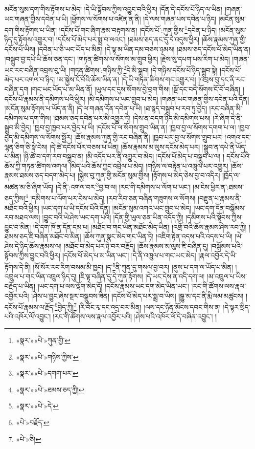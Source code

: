 མངོན་སུམ་དག་གིས་རྟོགས་པ་མེད། །དེ་ཡི་སྟོབས་ཀྱིས་འབྱུང་བའི་ཕྱིར། །དོན་དེ་དངོས་པོ་ཉིད་ལ་ཡིན། །གཞན་ཡང་གཞན་གྱིས་དབེན་པ་ཡི། །ཕྱོགས་ལ་སོགས་པ་འཛིན་ན་ནི། །དེ་ལས་གཞན་པས་དབེན་པ་ཉིད། །མངོན་སུམ་དག་གིས་རྟོགས་པ་ཡིན། །དངོས་པོ་གང་ཞིག་རྣམ་བརྟགས་ན། །དངོས་པོ་:ཀུན་གྱིས་\footnote{«སྣར་»«པེ་»ཀུན་གྱི་}དབེན་པ་ཉིད། །མངོན་སུམ་ཉིད་དུ་རྟོགས་འགྱུར་བ། །དངོས་པོ་མེད་པར་སྨྲ་བ་ལའང་། །ཐམས་ཅད་ནང་དུ་དེ་འདུས་ཕྱིར། །ཆོས་རྣམས་ཀུན་གྱི་དངོས་པོ་ཡིས། །དབེན་པ་ཅི་ཡང་ཡོད་པ་མིན། །དེ་ལྟ་མ་ཡིན་དམ་བཅས་ཉམས། །ཐམས་ཅད་དངོས་པོ་མེད་ཡིན་ན། །བསྒྲུབ་བྱ་དཔེ་ཡི་ཆོས་ཅན་དང་། །གཏན་ཚིགས་ལ་སོགས་མ་གྲུབ་ཕྱིར། །རྗེས་སུ་དཔག་པས་རིག་པ་མེད། །གཞན་ཡང་རང་བཞིན་འབྲས་བུ་ཡི། །གཏན་ཚིགས་:གཉིས་ཀྱི་\footnote{«སྣར་»«པེ་»གཉིས་ཀྱིས་}དེ་མི་སྒྲུབ། །དེ་གཉིས་དངོས་པོ་ཉིད་སྒྲུབ་སྟེ། །དངོས་པོ་མེད་པར་འགལ་བ་ཉིད། །མ་སྐྱེས་ངོ་བོའི་ཆོས་ཡིན་ན། །དེ་ཡི་གཏན་ཚིགས་གང་འགྱུར་བ། །འབྲས་བུ་དང་ནི་རང་བཞིན་དག །གང་ཡང་ཡོད་པ་མ་ཡིན་ནོ། །ཡུལ་དང་དུས་སོགས་བྱེ་བྲག་གིས། །སྔོ་དང་བདེ་སོགས་ངོ་བོ་བཞིན། །དངོས་པོ་རྣམས་ནི་དམིགས་པའི་ཕྱིར། །མི་དམིགས་པ་ཡང་གྲུབ་པ་མེད། །གཞན་ཡང་གཞན་གྱིས་དབེན་པའི་དོན། །མངོན་སུམ་རྟོགས་པ་ཡོད་ན་ནི། །དེ་ལ་གཞན་དོན་དབེན་པ་ཡི། །ཐ་སྙད་བསྒྲུབ་པ་རབ་ཏུ་བྱེད། །རང་བཞིན་མི་དམིགས་པ་དག་གིས། །ཐམས་ཅད་དབེན་པར་མི་འགྱུར་ཏེ། །དེས་ན་བདག་ཉིད་མི་དམིགས་པས། །རེ་ཞིག་དེ་ནི་སྒྲུབ་མི་བྱེད། །ཁྱབ་བྱ་ཁྱབ་པར་བྱེད་པ་ཡི། །དངོས་པོ་ལ་སོགས་གྲུབ་ཡིན་ན། །ཁྱབ་བྱ་ལ་སོགས་དགག་པ་ལ། །ཁྱབ་བྱེད་མི་དམིགས་ལ་སོགས་སྦྱོར། །ཆོས་རྣམས་ཀུན་གྱི་རང་བཞིན་ནི། །ཁྱབ་པར་བྱ་ལ་སོགས་གྲུབ་པར། །འགའ་དང་ལྷན་ཅིག་ཅི་སྟེ་ངེས། །དེ་ཚེ་དངོས་པོར་བཅས་པ་ཡིན། །ཆོས་རྣམས་མ་ལུས་དངོས་མེད་པར། །སྒྲུབ་ན་དཔེ་ནི་ཡོད་པ་མིན། །ཉི་ཚེ་བ་དག་རབ་བསྒྲུབ་ན། །མི་འདོད་པར་ནི་འགྱུར་བ་མེད། །དངོས་པོ་མེད་པ་བསྒྲུབ་པ་ལ། །
དངོས་པོའི་ཆོས་ཀྱི་གཏན་ཚིགས་འགལ། །མེད་པའི་ཆོས་ཀྱང་འབྲེལ་པ་མེད། །གཉིས་ལ་བརྟེན་པ་འཁྲུལ་པར་འགྱུར། །ཆོས་རྣམས་ཐམས་ཅད་བདག་མེད་པ། །སྐྱེས་བུ་ཀུན་གྱི་མངོན་སུམ་གྱིས། །རྟོགས་པ་མེད་ཅེས་བྱ་བ་འདིར། །ཁྱོད་ལ་མཚན་མ་ཅི་ཞིག་ཡོད། །དེ་ནི་:འགལ་བར་\footnote{«སྣར་»«པེ་»དགག་པར་}བྱ་བ་ལ། །རང་གི་དམིགས་པ་ལོག་པ་ཡང་། །མ་ངེས་ཕྱིར་ན་:ཐམས་ཅད་ཀྱིས།\footnote{«སྣར་»«པེ་»ཐམས་ཅད་ཀྱི།} །དམིགས་པ་ལོག་པར་ངེས་པ་མེད། །རབ་རིབ་ཅན་བཞིན་གཟུགས་ལ་སོགས། །བརྫུན་པ་རྣམས་ནི་མཐོང་བའི་ཕྱིར། །ཡང་དག་པ་ཡི་དངོས་པོའི་དོན། །མངོན་སུམ་འགའ་ཡང་གྲུབ་པ་མེད། །ཡང་དག་དོན་བསྒོམས་རབ་མཐའ་ལས། །བྱུང་བའི་ཡེ་ཤེས་ཡང་དག་པའི། །དོན་གྱི་ཡུལ་ཅན་ཡིན་འདོད་ཀྱི། །དམིགས་པའི་སྟོབས་ཀྱིས་བྱུང་བ་མིན། །དེ་དག་ཁོ་ན་དོན་དམ་པ། །མཐོང་བ་གང་ཡིན་མཐོང་མེད་ཡིན། །འགྲོ་བའི་ཆོས་རྣམས་ཤེས་རབ་ཀྱི། །ཐམས་ཅད་ཇི་བཞིན་མཐོང་བ་མིན། །ཆོས་ཀུན་སྣང་མེད་གང་ཡིན་ཏེ། །འཇིག་རྟེན་འདས་པའི་འདས་པ་ཡི། །ཡེ་ཤེས་དེ་ཉིད་ཆོས་རྣམས་ལ། །མཐོང་བ་མེད་པར་ཉེ་བར་བརྗོད། །ཆོས་རྣམས་མ་ལུས་ཇི་བཞིན་དུ། །བསྒོམས་པའི་སྟོབས་ཀྱིས་བྱུང་བའི་ཕྱིར། །དངོས་པོ་མེད་པ་མ་ཡིན་ཡང་། །དེ་ནི་འཁྲུལ་པ་གང་ཡང་མེད། །རྣལ་འབྱོར་དེ་ཡི་རྟོགས་དེ་ནི། །སོ་སོར་རང་རིག་བསམ་མི་ཁྱབ། །ད་\footnote{«སྣར་»«པེ་»དེ་}ནི་ཀུན་དུ་གསལ་བྱ་བར། །ནུས་པ་དག་ལ་ཡོད་པ་མིན། །འཁྲུལ་པ་གང་ཡིན་འཁྲུལ་ཉིད་དུ། །ཇི་ལྟ་བཞིན་དུ་དེ་ཀུན་རྟོགས། །དེ་ཡང་དེས་ན་འདི་དག་ལ། །མ་འཁྲུལ་པ་ཡིས་བརྗོད་པ་ཡིན། །ཡང་དག་པ་ལས་ལྡོག་མེད་དོ། །དངོས་རྣམས་ཡང་དག་མེད་ཡིན་ཡང་། །རང་གི་ཚོགས་ལས་རྣལ་འབྱོར་པའི། །ཤེས་པ་བྱུང་ཞེས་སྔར་བསྒྲུབས་ཟིན། །དངོས་པོ་མེད་པར་སྨྲ་བ་ཡིས། །སྒྱུ་མ་དང་ནི་རྨི་ལམ་མཚུངས། །དངོས་པོ་རྣམས་ལ་རྗོད་\footnote{«པེ་»བརྗོད་}བྱེད་ཀྱི།\footnote{«པེ་»ཅི།} །རི་བོང་རྭ་དང་འདྲ་བར་མིན། །ལས་དང་ཉོན་མོངས་དབང་གིས་ན། །དེ་ལྟར་སྲིད་པའི་འཁོར་ལོ་འབྱུང་། །རང་གི་ཚོགས་ལས་རྣལ་འབྱོར་པའི། །ཤེས་པའི་འཁོར་ལོ་དེ་བཞིན་འབྱུང་། །

